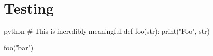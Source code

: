 \documentclass{article}
\begin{document}
    \bgstitlepage

    \section{Testing}

    \lipsum[5]

    \begin{mintedbox}{python}
# This is incredibly meaningful
def foo(str):
    print("Foo", str)

foo("bar")
    \end{mintedbox}

    \lipsum[1-20]
\end{document}
